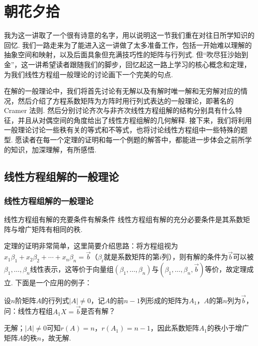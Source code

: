 \chapter{朝花夕拾} \label{chap:朝花夕拾}

我为这一讲取了一个很有诗意的名字，用以说明这一节我们重在对往日所学知识的回忆. 我们一路走来为了能进入这一讲做了太多准备工作，包括一开始难以理解的抽象空间和映射，以及后面具象但充满技巧性的矩阵与行列式. 但``吹尽狂沙始到金''，这一讲希望读者跟随我们的脚步，回忆起这一路上学习的核心概念和定理，为我们线性方程组一般理论的讨论画下一个完美的句点.

在解的一般理论中，我们将首先讨论有无解以及有解时唯一解和无穷解对应的情况，然后介绍了方程系数矩阵为方阵时用行列式表达的一般理论，即著名的 Cramer 法则. 然后分别讨论齐次与非齐次线性方程组解的结构分别具有什么特征，并且从对偶空间的角度给出了线性方程组解的几何解释. 接下来，我们将利用一般理论讨论一些秩有关的等式和不等式，也将讨论线性方程组中一些特殊的题型. 愿读者在每一个定理的证明和每一个例题的解答中，都能进一步体会之前所学的知识，加深理解，有所感悟.

\section{线性方程组解的一般理论}

\subsection{线性方程组解的一般理论}

\begin{theorem}{线性方程组有解的充要条件}{有解条件}
    线性方程组有解的充分必要条件是其系数矩阵与增广矩阵有相同的秩.
\end{theorem}
定理的证明非常简单，这里简要介绍思路：将方程组视为$x_1\beta_1+x_2\beta_2+\cdots+x_n\beta_n=\vec{b}$（$\beta_i$就是系数矩阵的第$i$列），则有解的条件为$\vec{b}$可以被$\beta_1,\ldots,\beta_n$线性表示，这等价于向量组$(\beta_1,\ldots,\beta_n)$与$(\beta_1,\ldots,\beta_n,\vec{b})$等价，故定理成立. 下面是一个应用的例子：

\begin{example}{}{}
    设$n$阶矩阵$A$的行列式$|A|\neq 0$，记$A$的前$n-1$列形成的矩阵为$A_1$，$A$的第$n$列为$\vec{b}$，问：线性方程组$A_1X=\vec{b}$是否有解？
\end{example}
\begin{solution}
    无解；$|A|\neq 0$可知$r(A)=n$，$r(A_1)=n-1$，因此系数矩阵$A_1$的秩小于增广矩阵$A$的秩$n$，故无解.
\end{solution}

